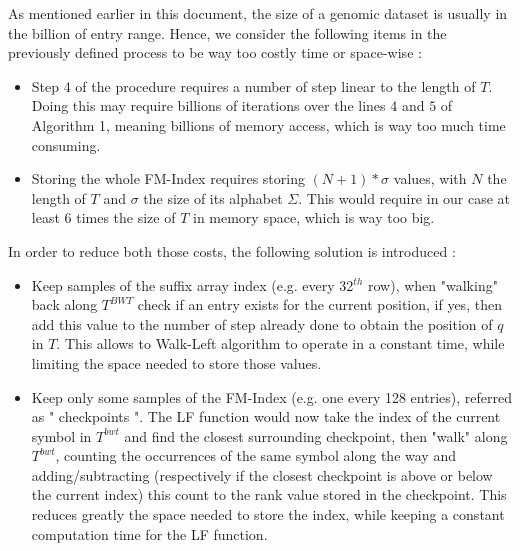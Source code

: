 As mentioned earlier in this document, the size of a genomic dataset is usually in the billion of entry range. Hence, we consider the following items in the previously defined process to be way too costly time or space-wise : 
\begin{itemize}
	\item Step 4 of the procedure requires a number of step linear to the length of $T$. Doing this may require billions of iterations over the lines $4$ and $5$ of Algorithm 1, meaning billions of memory access, which is way too much time consuming.
	\item Storing the whole FM-Index requires storing $(N + 1)*\sigma$ values, with $N$ the length of $T$ and $\sigma$ the size of its alphabet $\Sigma$. This would require in our case at least 6 times the size of $T$ in memory space, which is way too big.
	\end{itemize}
	In order to reduce both those costs, the following solution is introduced :
	\begin{itemize}
		\item Keep samples of the suffix array index (e.g. every 32$^{th}$ row), when "walking" back along $T^{BWT}$ check if an entry exists for the current position, if yes, then add this value to the number of step already done to obtain the position of $q$ in $T$. This allows to Walk-Left algorithm to operate in a constant time, while limiting the space needed to store those values.
		\item Keep only some samples of the FM-Index (e.g. one every 128 entries), referred as " checkpoints ". The LF function would now take the index of the current symbol in $T^{bwt}$ and find the closest surrounding checkpoint, then "walk" along $T^{bwt}$, counting the occurrences of the same symbol along the way and adding/subtracting (respectively if the closest checkpoint is above or below the current index) this count to the rank value stored in the checkpoint. This reduces greatly the space needed to store the index, while keeping a constant computation time for the LF function.
		\end{itemize}
		
